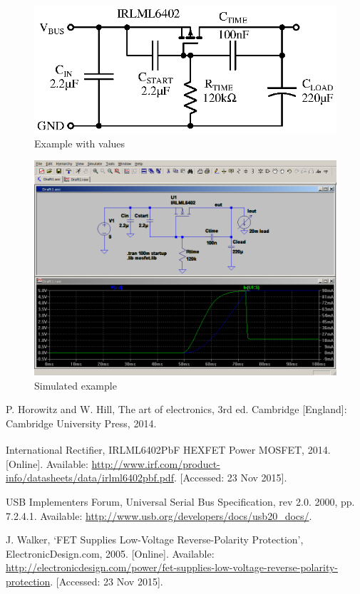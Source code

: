 \documentclass[letterpaper,12pt]{article}
\begin{document}
\begin{figure}[H]
\centering
\includegraphics{worked_example}
\caption{Example with values}
\end{figure}

\begin{figure}[H]
\centering
\includegraphics[width=6in]{example_sim}
\caption{Simulated example}
\end{figure}

\begin{thebibliography}{10}
P. Horowitz and W. Hill, The art of electronics, 3rd ed. Cambridge [England]: Cambridge University Press, 2014.

International Rectifier, IRLML6402PbF HEXFET\textsuperscript{\textregistered} Power MOSFET, 2014. [Online].
Available: \url{http://www.irf.com/product-info/datasheets/data/irlml6402pbf.pdf}. [Accessed: 23 Nov 2015].

USB Implementers Forum, Universal Serial Bus Specification, rev 2.0. 2000, pp. 7.2.4.1. Available: \url{http://www.usb.org/developers/docs/usb20_docs/}.

J. Walker, `FET Supplies Low-Voltage Reverse-Polarity Protection', ElectronicDesign.com, 2005. [Online].
Available: \url{http://electronicdesign.com/power/fet-supplies-low-voltage-reverse-polarity-protection}. [Accessed: 23 Nov 2015].

\end{thebibliography}
\end{document}

